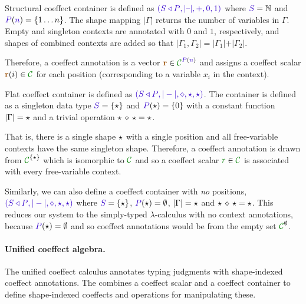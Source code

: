 \begin{example}
\label{ex:further-struct-shape}
Structural coeffect container is defined as $\sclrd{(\SHP, {|}\textnormal{--}{|}, +, 0, 1)}$
where $\SH=\mathbb{N}$ and $\SP(\sclrd{n})=\{ 1 \ldots n \}$. The shape mapping ${|}\Gamma{|}$ returns the
number of variables in $\Gamma$. Empty and singleton contexts are annotated with $0$ and $1$,
respectively, and shapes of combined contexts are added so that ${|}\Gamma_1, \Gamma_2{|} =
{|}\Gamma_1{|} + {|}\Gamma_2{|}$.

Therefore, a coeffect annotation is a vector
$\aclrd{\textbf{r}} \in \C^{\SP(\sclrd{n})}$ and assigns a coeffect scalar $\aclrd{\textbf{r}}(i) \in \C$
for each position (corresponding to a variable $x_i$ in the context).
\end{example}

\begin{example}
\label{ex:further-flat-shape}
Flat coeffect container is defined as $\sclrd{(\SHP, {|}-{|}, \diamond, \sflat, \sflat)}$.
The container is defined as a singleton data type $\SH = \{\sflat \}$ and $\SP(\sflat) = \{ 0 \}$
with a constant function ${|}\Gamma{|}=\star$ and a trivial operation $\star\,\diamond\,\star = \star$.

That is, there is a single shape
$\star$ with a single position and all free-variable contexts have the same singleton shape.
Therefore, a coeffect annotation is drawn from $\C^{\{\sflat\}}$ which is isomorphic to $\C$
and so a coeffect scalar $\cclrd{r}\in \C$ is associated with every free-variable context.
\end{example}

\begin{example}
Similarly, we can also define a coeffect container with \emph{no} positions,
\ie~$\sclrd{(\SHP, {|}-{|}, \diamond, \sflat, \sflat)}$ where $\SH = \{\sflat \}$, $\SP(\sflat) = \emptyset$,
${|}\Gamma{|}=\star$ and $\star\,\diamond\,\star = \star$.
This reduces our system to the simply-typed $\lambda$-calculus with no context annotations, because
$\SP(\sflat)=\emptyset$ and so coeffect annotations would be from the empty set $\C^\emptyset$.
\end{example}


\paragraph{Unified coeffect algebra.}
The unified coeffect calculus annotates typing judgments with shape-indexed coeffect annotations.
The \emph{} combines a coeffect scalar and a coeffect container
to define shape-indexed coeffects and operations for manipulating these.

